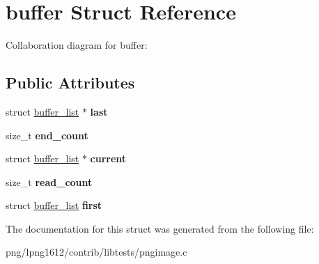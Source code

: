 \hypertarget{structbuffer}{\section{buffer Struct Reference}
\label{structbuffer}
}


Collaboration diagram for buffer\+:
\subsection*{Public Attributes}
\begin{DoxyCompactItemize}
\item 
\hypertarget{structbuffer_af834a78134b48d5fd17b97ad8299ef01}{struct \hyperlink{structbuffer__list}{buffer\+\_\+list} $\ast$ {\bfseries last}}\label{structbuffer_af834a78134b48d5fd17b97ad8299ef01}

\item 
\hypertarget{structbuffer_a261ed058ddaa49442003f54d67af744f}{size\+\_\+t {\bfseries end\+\_\+count}}\label{structbuffer_a261ed058ddaa49442003f54d67af744f}

\item 
\hypertarget{structbuffer_ad8a603932f88acdf48c8377069efe13a}{struct \hyperlink{structbuffer__list}{buffer\+\_\+list} $\ast$ {\bfseries current}}\label{structbuffer_ad8a603932f88acdf48c8377069efe13a}

\item 
\hypertarget{structbuffer_a6e55753aeb2924e66baa727b9f47b23b}{size\+\_\+t {\bfseries read\+\_\+count}}\label{structbuffer_a6e55753aeb2924e66baa727b9f47b23b}

\item 
\hypertarget{structbuffer_a57708daaf6b61c821e945e0c9ec47b39}{struct \hyperlink{structbuffer__list}{buffer\+\_\+list} {\bfseries first}}\label{structbuffer_a57708daaf6b61c821e945e0c9ec47b39}

\end{DoxyCompactItemize}


The documentation for this struct was generated from the following file\+:\begin{DoxyCompactItemize}
\item 
png/lpng1612/contrib/libtests/pngimage.\+c\end{DoxyCompactItemize}
